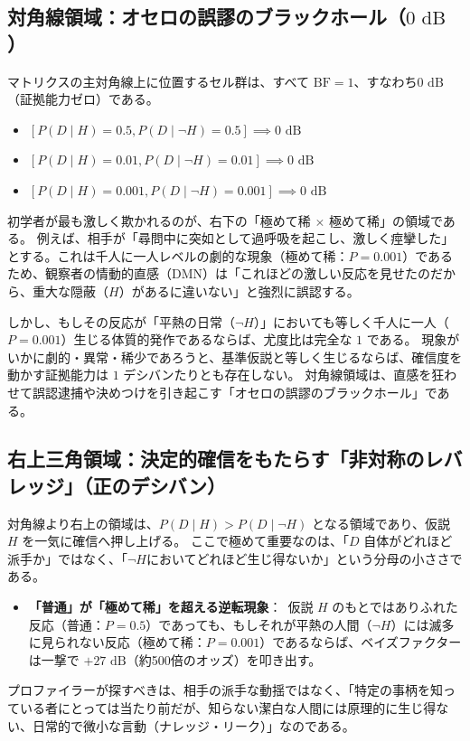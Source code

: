 \subsection{対角線領域：オセロの誤謬のブラックホール（$0\text{ dB}$）}
マトリクスの主対角線上に位置するセル群は、すべて $\mathrm{BF} = 1$、すなわち$0\text{ dB}$（証拠能力ゼロ）である。
\begin{itemize}
\item $[P(D \mid H) = 0.5, P(D \mid \neg H) = 0.5] \implies 0\text{ dB}$
\item $[P(D \mid H) = 0.01, P(D \mid \neg H) = 0.01] \implies 0\text{ dB}$
\item $[P(D \mid H) = 0.001, P(D \mid \neg H) = 0.001] \implies 0\text{ dB}$
\end{itemize}
初学者が最も激しく欺かれるのが、右下の「極めて稀 $\times$ 極めて稀」の領域である。
例えば、相手が「尋問中に突如として過呼吸を起こし、激しく痙攣した」とする。これは千人に一人レベルの劇的な現象（極めて稀：$P = 0.001$）であるため、観察者の情動的直感（DMN）は「これほどの激しい反応を見せたのだから、重大な隠蔽（$H$）があるに違いない」と強烈に誤認する。

しかし、もしその反応が「平熱の日常（$\neg H$）」においても等しく千人に一人（$P = 0.001$）生じる体質的発作であるならば、尤度比は完全な $1$ である。
現象がいかに劇的・異常・稀少であろうと、基準仮説と等しく生じるならば、確信度を動かす証拠能力は $1$ デシバンたりとも存在しない。
対角線領域は、直感を狂わせて誤認逮捕や決めつけを引き起こす「オセロの誤謬のブラックホール」である。

\subsection{右上三角領域：決定的確信をもたらす「非対称のレバレッジ」（正のデシバン）}
対角線より右上の領域は、$P(D \mid H) > P(D \mid \neg H)$ となる領域であり、仮説 $H$ を一気に確信へ押し上げる。
ここで極めて重要なのは、「$D$ 自体がどれほど派手か」ではなく、「$\neg H$においてどれほど生じ得ないか」という分母の小ささである。

\begin{itemize}
\item \textbf{「普通」が「極めて稀」を超える逆転現象}：\
仮説 $H$ のもとではありふれた反応（普通：$P = 0.5$）であっても、もしそれが平熱の人間（$\neg H$）には滅多に見られない反応（極めて稀：$P = 0.001$）であるならば、ベイズファクターは一撃で $+27\text{ dB}$（約500倍のオッズ）を叩き出す。
\end{itemize}
プロファイラーが探すべきは、相手の派手な動揺ではなく、「特定の事柄を知っている者にとっては当たり前だが、知らない潔白な人間には原理的に生じ得ない、日常的で微小な言動（ナレッジ・リーク）」なのである。

